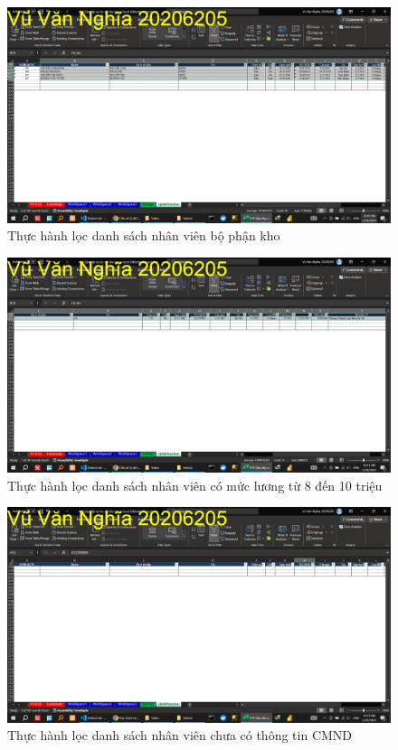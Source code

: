 \documentclass{article}
\begin{document}
\begin{figure}[h]
\centering
\includegraphics[scale = 0.15]{Video2/ThucHanh/3.png}
\caption{Thực hành lọc danh sách nhân viên bộ phận kho}
\end{figure}

\begin{figure}[h]
\centering
\includegraphics[scale = 0.15]{Video2/ThucHanh/4.png}
\caption{Thực hành lọc danh sách nhân viên có mức lương từ 8 đến 10 triệu}
\end{figure}

\begin{figure}[h]
\centering
\includegraphics[scale = 0.15]{Video2/ThucHanh/5.png}
\caption{Thực hành lọc danh sách nhân viên chưa có thông tin CMND}
\end{figure}
\end{document}
